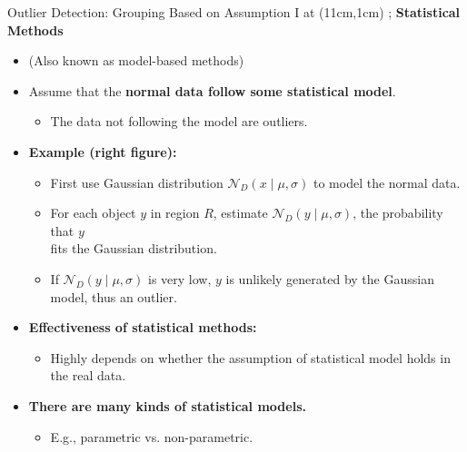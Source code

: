 \begin{frame}{Outlier Detection: Grouping Based on Assumption I}
	\tikzoverlay at (11cm,1cm) {};
	\textcolor{faugray}{\textbf{Statistical Methods}}
	\begin{itemize}
		\item (Also known as model-based methods)
		\item Assume that the \textbf{\color{airforceblue}normal data follow some statistical model}.
		      \begin{itemize}
			      \item The data not following the model are outliers.
		      \end{itemize}
		\item \textbf{Example (right figure):}
		      \begin{itemize}
			      \item First use Gaussian distribution $\mathcal{N}_D(x \; \vert \; \mu,\sigma)$ to model the normal data.
			      \item For each object $y$ in region $R$, estimate $\mathcal{N}_D(y \; \vert \; \mu, \sigma)$, the probability that $y$ \\
			            fits the Gaussian distribution.
			      \item If $\mathcal{N}_D(y \; \vert \; \mu, \sigma)$ is very low, $y$ is unlikely generated by the Gaussian model, thus an outlier.
		      \end{itemize}
		\item\textbf{Effectiveness of statistical methods:}
		      \begin{itemize}
			      \item Highly depends on whether the assumption of statistical model holds in the real data.
		      \end{itemize}
		\item \textbf{There are many kinds of statistical models.}
		      \begin{itemize}
			      \item E.g., parametric vs. non-parametric.
		      \end{itemize}
	\end{itemize}
\end{frame}


